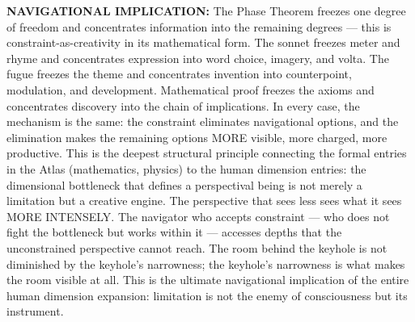 \textbf{NAVIGATIONAL IMPLICATION:} The Phase Theorem freezes one degree of freedom and concentrates information into the remaining degrees — this is constraint-as-creativity in its mathematical form. The sonnet freezes meter and rhyme and concentrates expression into word choice, imagery, and volta. The fugue freezes the theme and concentrates invention into counterpoint, modulation, and development. Mathematical proof freezes the axioms and concentrates discovery into the chain of implications. In every case, the mechanism is the same: the constraint eliminates navigational options, and the elimination makes the remaining options MORE visible, more charged, more productive. This is the deepest structural principle connecting the formal entries in the Atlas (mathematics, physics) to the human dimension entries: the dimensional bottleneck that defines a perspectival being is not merely a limitation but a creative engine. The perspective that sees less sees what it sees MORE INTENSELY. The navigator who accepts constraint — who does not fight the bottleneck but works within it — accesses depths that the unconstrained perspective cannot reach. The room behind the keyhole is not diminished by the keyhole's narrowness; the keyhole's narrowness is what makes the room visible at all. This is the ultimate navigational implication of the entire human dimension expansion: limitation is not the enemy of consciousness but its instrument.


\bigskip\noindent\makebox[\textwidth]{\color{rulegray}\rule{5cm}{0.3pt}}\bigskip

